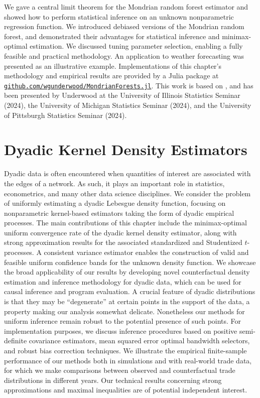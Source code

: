 \documentclass[11pt,lof]{puthesis}
\newcommand{\github}[1]{\href{https://github.com/#1}{\texttt{github.com/#1}}}
\theoremstyle{break}
\theoremstyle{proof}
\begin{document}
We gave a central limit theorem for the Mondrian random forest estimator
and showed how to perform statistical inference on an unknown nonparametric
regression function. We introduced debiased versions of the Mondrian random
forest, and demonstrated their advantages
for statistical inference and minimax-optimal estimation. We discussed
tuning parameter selection, enabling a fully feasible and practical methodology.
An application to weather forecasting was presented
as an illustrative example. Implementations of this chapter's methodology and
empirical results are provided by a Julia
package at \github{wgunderwood/MondrianForests.jl}.
This work is based on \citet{cattaneo2023inference}, and has been
presented by Underwood at the University of Illinois Statistics Seminar (2024),
the University of Michigan Statistics Seminar (2024), and the University of
Pittsburgh Statistics Seminar (2024).

\chapter{Dyadic Kernel Density Estimators}
\label{ch:kernel}

Dyadic data is often encountered when quantities of interest are associated
with the edges of a network. As such, it plays an important role in statistics,
econometrics, and many other data science disciplines. We consider the problem
of uniformly estimating a dyadic Lebesgue density function, focusing on
nonparametric kernel-based estimators taking the form of dyadic empirical
processes. The main contributions of this chapter
include the minimax-optimal uniform
convergence rate of the dyadic kernel density estimator, along with strong
approximation results for the associated standardized and Studentized
$t$-processes. A consistent variance estimator enables the construction of
valid and feasible uniform confidence bands for the unknown density function.
We showcase the broad applicability of our results by developing novel
counterfactual density estimation and inference methodology for dyadic data,
which can be used for causal inference and program evaluation. A crucial
feature of dyadic distributions is that they may be ``degenerate'' at certain
points in the support of the data, a property making our analysis somewhat
delicate. Nonetheless our methods for uniform inference remain robust to the
potential presence of such points. For implementation purposes, we discuss
inference procedures based on positive semi-definite covariance estimators,
mean squared error optimal bandwidth selectors, and robust bias correction
techniques. We illustrate the empirical finite-sample performance of our
methods both in simulations and with real-world trade data, for which we make
comparisons between observed and counterfactual trade distributions in
different years. Our technical results concerning strong approximations and
maximal inequalities are of potential independent interest.
\end{document}
